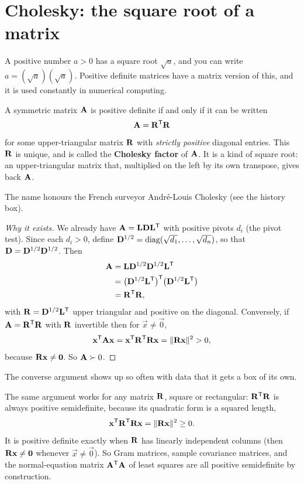 \section{Cholesky: the square root of a matrix}

A positive number $a>0$ has a square root $\sqrt a$, and you can write $a = (\sqrt a)(\sqrt a)$.
Positive definite matrices have a matrix version of this, and it is used constantly in numerical
computing.

\begin{theorem}
\label{ch27:thm-cholesky}
A symmetric matrix $\mathbf{A}$ is positive definite if and only if it can be written
\[
  \mathbf{A} = \mathbf{R}^{\mathsf{T}}\mathbf{R}
\]
for some upper-triangular matrix $\mathbf{R}$ with \emph{strictly positive} diagonal entries. This
$\mathbf{R}$ is unique, and is called the \textbf{Cholesky factor} of $\mathbf{A}$. It is a kind of square
root: an upper-triangular matrix that, multiplied on the left by its own transpose, gives back
$\mathbf{A}$.
\end{theorem}

The name honours the French surveyor Andr\'e-Louis Cholesky (see the history box).

\begin{proof}[Why it exists]
We already have $\mathbf{A} = \mathbf{L}\mathbf{D}\mathbf{L}^{\mathsf{T}}$ with positive pivots $d_i$ (the pivot test). Since
each $d_i > 0$, define $\mathbf{D}^{1/2} = \operatorname{diag}(\sqrt{d_1},\dots,\sqrt{d_n})$, so that $\mathbf{D} =
\mathbf{D}^{1/2}\mathbf{D}^{1/2}$. Then
\begin{align*}
  \mathbf{A} &= \mathbf{L}\mathbf{D}^{1/2}\mathbf{D}^{1/2}\mathbf{L}^{\mathsf{T}} \\
  &= \big(\mathbf{D}^{1/2}\mathbf{L}^{\mathsf{T}}\big)^{\mathsf{T}}\big(\mathbf{D}^{1/2}\mathbf{L}^{\mathsf{T}}\big) \\
  &= \mathbf{R}^{\mathsf{T}}\mathbf{R},
\end{align*}
with $\mathbf{R} = \mathbf{D}^{1/2}\mathbf{L}^{\mathsf{T}}$ upper triangular and positive on the diagonal. Conversely, if
$\mathbf{A}=\mathbf{R}^{\mathsf{T}}\mathbf{R}$ with $\mathbf{R}$ invertible then for $\vec{x}\neq\vec{0}$,
\[
  \mathbf{x}^{\mathsf{T}}\mathbf{A}\mathbf{x} = \mathbf{x}^{\mathsf{T}}\mathbf{R}^{\mathsf{T}}\mathbf{R}\mathbf{x} = \lVert\mathbf{R}\mathbf{x}\rVert^2 > 0,
\]
because $\mathbf{R}\mathbf{x}\neq\mathbf{0}$. So $\mathbf{A}\succ0$.
\end{proof}

The converse argument shows up so often with data that it gets a box of its own.

\begin{aestheticbox}
The same argument works for any matrix $\mathbf{R}$, square or rectangular: $\mathbf{R}^{\mathsf{T}}\mathbf{R}$ is
always positive semidefinite, because its quadratic form is a squared length,
\[
  \mathbf{x}^{\mathsf{T}}\mathbf{R}^{\mathsf{T}}\mathbf{R}\mathbf{x}=\lVert\mathbf{R}\mathbf{x}\rVert^2 \geq 0.
\]
It is positive definite exactly when $\mathbf{R}$ has linearly independent columns (then
$\mathbf{R}\mathbf{x}\neq\mathbf{0}$ whenever $\vec{x}\neq\vec{0}$). So Gram matrices, sample covariance
matrices, and the normal-equation matrix $\mathbf{A}^{\mathsf{T}}\mathbf{A}$ of least squares are all positive
semidefinite by construction.
\end{aestheticbox}

